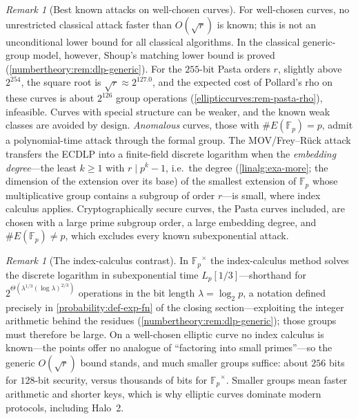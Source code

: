 \documentclass[11pt,a4paper]{article}
\theoremstyle{definition}
\theoremstyle{remark}
\newtheorem{remark}[theorem]{Remark}
\newcommand{\Fp}{\ensuremath{\mathbb{F}_{p}}}
\begin{document}
\begin{remark}[Best known attacks on well-chosen curves]
\label{ellipticcurves:rem-ecdlp-hardness}
For well-chosen curves, no unrestricted classical attack faster than
\(O(\sqrt{r})\) is known; this is not an unconditional lower bound for
all classical algorithms. In the classical generic-group model, however,
Shoup's matching lower bound is proved
(\cref{numbertheory:rem:dlp-generic}). For the \(255\)-bit Pasta orders
\(r\), slightly above \(2^{254}\), the square root is
\(\sqrt r \approx 2^{127.0}\), and the expected cost of Pollard's rho on
these curves is about \(2^{126}\) group operations
(\cref{ellipticcurves:rem-pasta-rho}), infeasible. Curves with special
structure can be weaker, and the known weak classes are avoided by
design. \emph{Anomalous} curves, those with \(\#E(\Fp) = p\), admit a
polynomial-time attack through the formal group. The MOV/Frey--Rück
attack transfers the ECDLP into a finite-field discrete logarithm
when the \emph{embedding degree}---the least \(k \geq 1\) with
\(r \mid p^k - 1\), i.e.\ the degree (\cref{linalg:exa-more};
the dimension of the extension over its base) of the smallest extension
of \(\Fp\) whose multiplicative group contains a subgroup of order
\(r\)---is small, where index calculus applies. Cryptographically
secure curves, the Pasta curves included, are chosen with a large prime
subgroup order, a large embedding degree, and \(\#E(\Fp) \neq p\),
which excludes every known subexponential attack.
\end{remark}

\begin{remark}[The index-calculus contrast]
\label{ellipticcurves:rem-index-calculus}
In \(\Fp^\times\) the index-calculus method solves the discrete logarithm
in subexponential time \(L_p[1/3]\)---shorthand for
\(2^{\Theta(\lambda^{1/3} (\log \lambda)^{2/3})}\) operations in the
bit length \(\lambda = \log_2 p\), a notation defined precisely in
\cref{probability:def-exp-fn} of the closing section---exploiting the
integer arithmetic behind the residues
(\cref{numbertheory:rem:dlp-generic}); those groups must therefore be
large. On a well-chosen elliptic curve no index calculus is
known---the points offer no analogue of ``factoring into small
primes''---so the generic \(O(\sqrt{r})\) bound stands, and much
smaller groups suffice: about \(256\) bits for \(128\)-bit security,
versus thousands of bits for \(\Fp^\times\). Smaller groups mean
faster arithmetic and shorter keys, which is why elliptic curves dominate
modern protocols, including Halo~2.
\end{remark}
\end{document}
